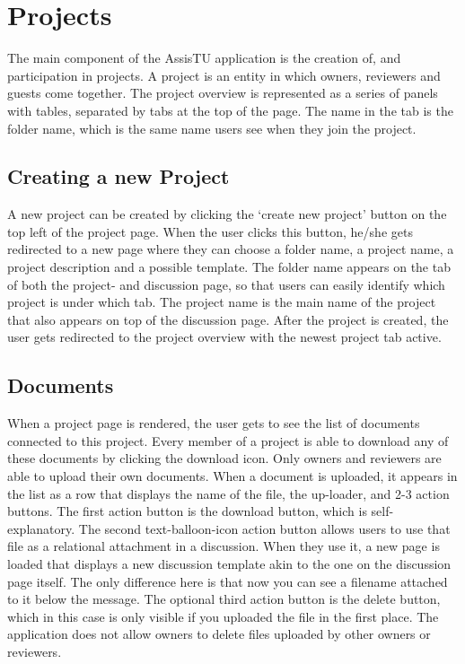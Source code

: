 \section{Projects}
The main component of the AssisTU application is the creation of, and participation in projects. A project is an entity in which owners, reviewers and guests come together. The project overview is represented as a series of panels with tables, separated by tabs at the top of the page. The name in the tab is the folder name, which is the same name users see when they join the project. 

\subsection{Creating a new Project}
A new project can be created by clicking the `create new project' button on the top left of the project page. When the user clicks this button, he/she gets redirected to a new page where they can choose a folder name, a project name, a project description and a possible template. The folder name appears on the tab of both the project- and discussion page, so that users can easily identify which project is under which tab. The project name is the main name of the project that also appears on top of the discussion page. After the project is created, the user gets redirected to the project overview with the newest project tab active.

\subsection{Documents}
When a project page is rendered, the user gets to see the list of documents connected to this project. Every member of a project is able to download any of these documents by clicking the download icon. Only owners and reviewers are able to upload their own documents. When a document is uploaded, it appears in the list as a row that displays the name of the file, the up-loader, and 2-3 action buttons. The first action button is the download button, which is self-explanatory. The second text-balloon-icon action button allows users to use that file as a relational attachment in a discussion. When they use it, a new page is loaded that displays a new discussion template akin to the one on the discussion page itself. The only difference here is that now you can see a filename attached to it below the message. The optional third action button is the delete button, which in this case is only visible if you uploaded the file in the first place. The application does not allow owners to delete files uploaded by other owners or reviewers.

